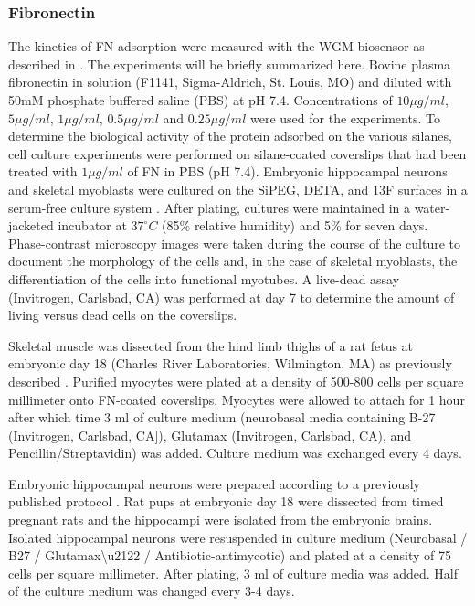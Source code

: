 \subsubsection{Fibronectin}

The kinetics of FN adsorption were measured with the WGM biosensor
as described in \cite{Wilson2011}. The experiments will be briefly
summarized here. Bovine plasma fibronectin in solution (F1141, Sigma-Aldrich,
St. Louis, MO) and diluted with 50mM phosphate buffered saline (PBS)
at pH 7.4. Concentrations of $10\mu g/ml$, $5\mu g/ml$, $1\mu g/ml$,
$0.5\mu g/ml$ and $0.25\mu g/ml$ were used for the experiments.
To determine the biological activity of the protein adsorbed on the
various silanes, cell culture experiments were performed on silane-coated
coverslips that had been treated with $1\mu g/ml$ of FN in PBS (pH
7.4). Embryonic hippocampal neurons and skeletal myoblasts were cultured
on the SiPEG, DETA, and 13F surfaces in a serum-free culture system
\cite{Brewer1995,Das2007}. After plating, cultures were maintained
in a water-jacketed incubator at $37^{\circ}C$ (85\% relative humidity)
and 5\%  for seven days. Phase-contrast microscopy images
were taken during the course of the culture to document the morphology
of the cells and, in the case of skeletal myoblasts, the differentiation
of the cells into functional myotubes. A live-dead assay (Invitrogen,
Carlsbad, CA) was performed at day 7 to determine the amount of living
versus dead cells on the coverslips.

Skeletal muscle was dissected from the hind limb thighs of a rat fetus
at embryonic day 18 (Charles River Laboratories, Wilmington, MA) as
previously described \cite{Wilson2011}. Purified myocytes were plated
at a density of 500-800 cells per square millimeter onto FN-coated
coverslips. Myocytes were allowed to attach for 1 hour after which
time 3 ml of culture medium (neurobasal media containing B-27 (Invitrogen,
Carlsbad, CA{]}), Glutamax (Invitrogen, Carlsbad, CA), and Pencillin/Streptavidin)
was added. Culture medium was exchanged every 4 days. 

Embryonic hippocampal neurons were prepared according to a previously
published protocol \cite{Wilson2011}. Rat pups at embryonic day 18
were dissected from timed pregnant rats and the hippocampi were isolated
from the embryonic brains. Isolated hippocampal neurons were resuspended
in culture medium (Neurobasal / B27 / Glutamax\textbackslash{}u2122
/ Antibiotic-antimycotic) and plated at a density of 75 cells per
square millimeter. After plating, 3 ml of culture media was added.
Half of the culture medium was changed every 3-4 days. 


